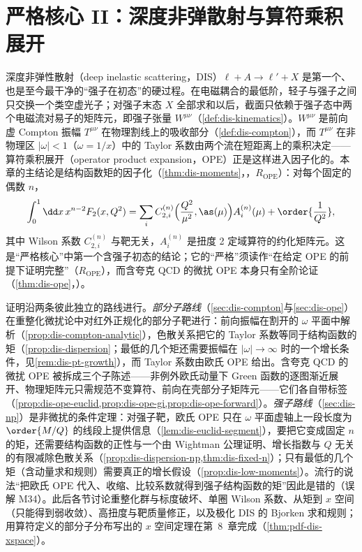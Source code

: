 \chapter{严格核心 II：深度非弹散射与算符乘积展开}\label{ch:dis}

深度非弹性散射（deep inelastic scattering，DIS）$\ell+A\to\ell'+X$ 是第一个、也是至今最干净的“强子在初态”的硬过程。在电磁耦合的最低阶，轻子与强子之间只交换一个类空虚光子；对强子末态 $X$ 全部求和以后，截面只依赖于强子态中两个电磁流对易子的矩阵元，即强子张量 $W^{\mu\nu}$（\cref{def:dis-kinematics}）。$W^{\mu\nu}$ 是前向虚 Compton 振幅 $T^{\mu\nu}$ 在物理割线上的吸收部分（\cref{def:dis-compton}），而 $T^{\mu\nu}$ 在非物理区 $|\omega|<1$（$\omega=1/x$）中的 Taylor 系数由两个流在短距离上的乘积决定——算符乘积展开（operator product expansion，OPE）正是这样进入因子化的。本章的主结论是结构函数矩的因子化（\cref{thm:dis-moments}，\tagR，$R_{\mathrm{OPE}}$）：对每个固定的偶数 $n$，
\[
\int_0^1\dd x\,x^{n-2}F_2(x,Q^2)=\sum_iC^{(n)}_{2,i}\Big(\frac{Q^2}{\mu^2},\as(\mu)\Big)A^{(n)}_i(\mu)+\order{\frac{1}{Q^2}},
\]
其中 Wilson 系数 $C^{(n)}_{2,i}$ 与靶无关，$A^{(n)}_i$ 是扭度 2 定域算符的约化矩阵元。这是“严格核心”中第一个含强子初态的结论；它的“严格”须读作“在给定 OPE 的前提下证明完整”（$R_{\mathrm{OPE}}$），而含夸克 QCD 的微扰 OPE 本身只有全阶论证（\cref{thm:dis-ope}，\tagA）。

证明沿两条彼此独立的路线进行。\emph{部分子路线}（\cref{sec:dis-compton}与\cref{sec:dis-ope}）在重整化微扰论中对红外正规化的部分子靶进行：前向振幅在割开的 $\omega$ 平面中解析（\cref{prop:dis-compton-analytic}），色散关系把它的 Taylor 系数等同于结构函数的矩（\cref{prop:dis-dispersion}；最低的几个矩还需要振幅在 $|\omega|\to\infty$ 时的一个增长条件，见\cref{rem:dis-pt-growth}），而 Taylor 系数由欧氏 OPE 给出。含夸克 QCD 的微扰 OPE 被拆成三个子陈述——非例外欧氏动量下 Green 函数的逐图渐近展开、物理矩阵元只需规范不变算符、前向在壳部分子矩阵元——它们各自带标签（\cref{prop:dis-ope-euclid,prop:dis-ope-gi,prop:dis-ope-forward}）。\emph{强子路线}（\cref{sec:dis-np}）是非微扰的条件定理：对强子靶，欧氏 OPE 只在 $\omega$ 平面虚轴上一段长度为 $\order{M/Q}$ 的线段上提供信息（\cref{lem:dis-euclid-segment}），要把它变成固定 $n$ 的矩，还需要结构函数的正性与一个由 Wightman 公理证明、增长指数与 $Q$ 无关的有限减除色散关系（\cref{prop:dis-dispersion-np,thm:dis-fixed-n}）；只有最低的几个矩（含动量求和规则）需要真正的增长假设（\cref{prop:dis-low-moments}）。流行的说法“把欧氏 OPE 代入、收缩、比较系数就得到强子结构函数的矩”因此是错的（误解 M34）。此后各节讨论重整化群与标度破坏、单圈 Wilson 系数、从矩到 $x$ 空间（只能得到弱收敛）、高扭度与靶质量修正，以及极化 DIS 的 Bjorken 求和规则；用算符定义的部分子分布写出的 $x$ 空间定理在第~8~章完成（\cref{thm:pdf-dis-xspace}）。


